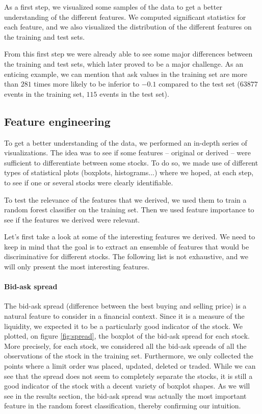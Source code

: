 \documentclass[switch, 11pt]{article}
\begin{document}
\begin{multicols}{2}
    \vspace{-0.5cm}

    As a first step, we visualized some samples of the data to get a better understanding of the different features. We computed significant statistics for each feature, and we also visualized the distribution of the different features on the training and test sets.

    From this first step we were already able to see some major differences between the training and test sets, which later proved to be a major challenge. As an enticing example, we can mention that ask values in the training set are more than $281$ times more likely to be inferior to $-0.1$ compared to the test set ($63877$ events in the training set, $115$ events in the test set).

    \subsection{Feature engineering}
    To get a better understanding of the data, we performed an in-depth series of visualizations. The idea was to see if some features -- original or derived -- were sufficient to differentiate between some stocks. To do so, we made use of different types of statistical plots (boxplots, histograms...) where we hoped, at each step, to see if one or several stocks were clearly identifiable.

    To test the relevance of the features that we derived, we used them to train a random forest classifier on the training set. Then we used feature importance to see if the features we derived were relevant.

    Let's first take a look at some of the interesting features we derived. We need to keep in mind that the goal is to extract an ensemble of features that would be discriminative for different stocks. The following list is not exhaustive, and we will only present the most interesting features.

    \paragraph{Bid-ask spread}
    The bid-ask spread (difference between the best buying and selling price) is a natural feature to consider in a financial context. Since it is a measure of the liquidity, we expected it to be a particularly good indicator of the stock. We plotted, on figure \ref{fig:spread}, the boxplot of the bid-ask spread for each stock. More precisely, for each stock, we considered all the bid-ask spreads of all the observations of the stock in the training set. Furthermore, we only collected the points where a limit order was placed, updated, deleted or traded. While we can see that the spread does not seem to completely separate the stocks, it is still a good indicator of the stock with a decent variety of boxplot shapes. As we will see in the results section, the bid-ask spread was actually the most important feature in the random forest classification, thereby confirming our intuition.


\end{multicols}
\end{document}
